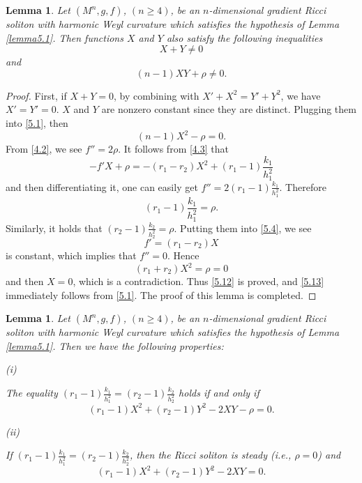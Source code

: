 \documentclass{amsart}
\newtheorem{lemma}[theorem]{Lemma}
\theoremstyle{definition}
\theoremstyle{remark}
\numberwithin{equation}{section}
\begin{document}
\begin{lemma}\label{lemma5.2} 
	Let $(M^n, g, f)$, $(n\geq 4)$, be an $n$-dimensional gradient Ricci soliton with harmonic Weyl curvature which satisfies the hypothesis of Lemma \ref{lemma5.1}.
	Then functions $X$ and $Y$ also satisfy the following inequalities
	\begin{equation}\label{5.12}
     X+Y\neq0
	\end{equation}
and
	\begin{equation}\label{5.13}
	(n-1)XY+\rho \neq 0.
	\end{equation}
\end{lemma}

\begin{proof}
	First, if $X+Y=0$, by combining with $X'+X^2=Y'+Y^2$, we have $X'=Y'=0$.
	$X$ and $Y$ are nonzero constant since they are distinct.
	Plugging them into \eqref{5.1}, then
	\[
	(n-1)X^2-\rho=0.
	\]
	From \eqref{4.2}, we see $f''=2\rho$. It follows from \eqref{4.3} that
	\[
	-f'X+\rho=-(r_1-r_2)X^2+(r_1-1) \frac{k_1}{h^2_1}
	\]
	and then differentiating it, one can easily get $f''=2(r_1-1) \frac{k_1}{h^2_1}$. Therefore 
	\[
	(r_1-1) \frac{k_1}{h^2_1}=\rho.
	\]
	Similarly, it holds that $(r_2-1) \frac{k_2}{h^2_2}=\rho$. 
	Putting them into \eqref{5.4}, we see
	\[
	f'=(r_1-r_2)X
	\]
	is constant, which implies that $f''=0$.
	Hence
	\[
	(r_1+r_2)X^2=\rho=0
	\]
	and then $X=0$, which is a contradiction. Thus \eqref{5.12} is proved, and 
	\eqref{5.13} immediately follows from \eqref{5.1}. The proof of this lemma is completed. 	
\end{proof}

\begin{lemma}\label{lemma5.3} 	
	Let $(M^n, g, f)$, $(n\geq 4)$, be an $n$-dimensional gradient Ricci soliton with harmonic Weyl curvature
	which satisfies the hypothesis of Lemma \ref{lemma5.1}.  Then we have the following properties:
	{\item {\rm (i)}} The equality
$(r_1-1)\frac{k_1}{h^2_1}= (r_2-1)\frac{k_2}{h^2_2}$
holds if and only if 
	\begin{equation}\label{5.14}
	(r_1-1)X^2+(r_2-1)Y^2-2XY-\rho = 0.
	\end{equation}

	{\item {\rm (ii)}}
	If	$(r_1-1)\frac{k_1}{h^2_1}= (r_2-1)\frac{k_2}{h^2_2}$,
	then the Ricci soliton is steady {\rm (}i.e., $\rho=0${\rm )} and 
	\begin{equation}\label{5.15}
	(r_1-1)X^2+(r_2-1)Y^2-2XY= 0.
	\end{equation}
\end{lemma}
\end{document}
